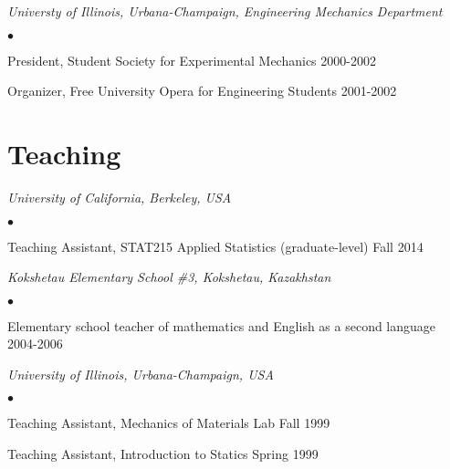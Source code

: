 \documentclass[margin,line]{res}
\newenvironment{list2}{
  \begin{list}{$\bullet$}{%
      \setlength{\itemsep}{0in}
      \setlength{\parsep}{0in} \setlength{\parskip}{0in}
      \setlength{\topsep}{0in} \setlength{\partopsep}{0in}
      \setlength{\leftmargin}{0.2in}}}{\end{list}}
\begin{document}
\begin{resume}
{\em Universty of Illinois, Urbana-Champaign, Engineering Mechanics Department}
\begin{list2}
    \item President, Student Society for Experimental Mechanics \hfill 2000-2002
    \item Organizer, Free University Opera for Engineering Students \hfill 2001-2002
\end{list2}


\section{\sc Teaching}

\emph{University of California, Berkeley, USA}
\begin{list2}
\item Teaching Assistant, STAT215 Applied Statistics
(graduate-level) \hfill Fall 2014
\end{list2}

\emph{Kokshetau Elementary School \#3, Kokshetau, Kazakhstan}
\begin{list2}
\item Elementary school teacher of mathematics and English as a second language
\hfill 2004-2006
\end{list2}

\emph{University of Illinois, Urbana-Champaign, USA}
\begin{list2}
\item Teaching Assistant, Mechanics of Materials Lab \hfill Fall 1999
\item Teaching Assistant, Introduction to Statics \hfill Spring 1999
\end{list2}

\end{resume}
\end{document}
